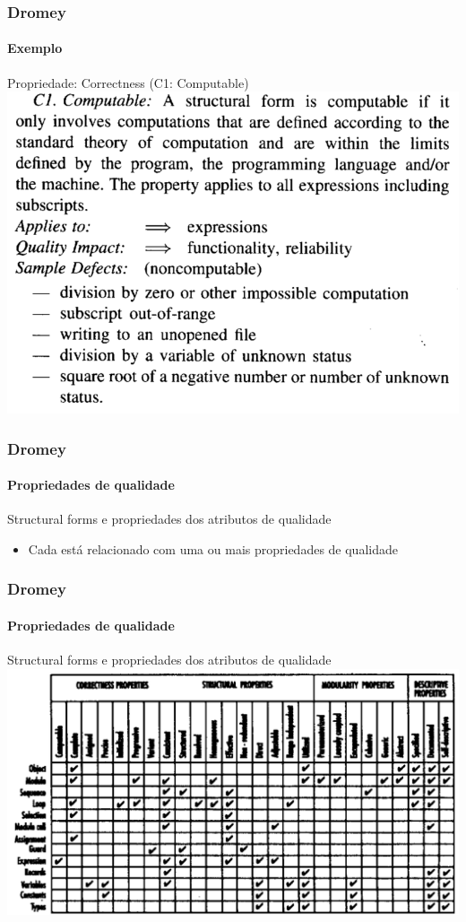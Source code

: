\begin{frame}
	\frametitle{Dromey}
	\framesubtitle{Exemplo}

	\begin{block:fact}{Propriedade: Correctness (C1: Computable)}
		\centering
		\includegraphics[width=.7\textwidth]{software-engineering/project-management/product/dromey/dromey-property_example}
	\end{block:fact}

\end{frame}



\begin{frame}
	\frametitle{Dromey}
	\framesubtitle{Propriedades de qualidade}
	
	\begin{block:fact}{Structural forms e propriedades dos atributos de qualidade}
		\begin{itemize}
			\item Cada  está relacionado com uma ou mais
			propriedades de qualidade
		\end{itemize}
	\end{block:fact}
\end{frame}


\begin{frame}
	\frametitle{Dromey}
	\framesubtitle{Propriedades de qualidade}
	
	\begin{block:fact}{Structural forms e propriedades dos atributos de qualidade}
		\centering
		\includegraphics[width=\textwidth]{software-engineering/project-management/product/dromey/dromey-structural_forms_X_properties}
	\end{block:fact}
\end{frame}


